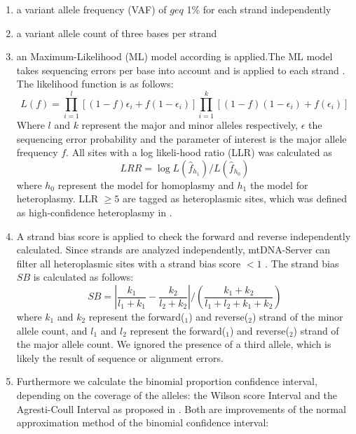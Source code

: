 \begin{enumerate}
\item  a variant allele frequency (VAF) of $geq$ 1\% for each strand independently  
\item  a variant allele count of three bases per strand 
\item  an Maximum-Likelihood (ML) model according \cite{Ye2014} is applied.The ML model takes sequencing errors per base into account and is applied to each strand \cite{Weissensteiner2016b}. The likelihood function is as follows:
\begin{equation}
  L(f)=\prod_{i=1}^{l} [(1-f) \epsilon_{i} + f(1-\epsilon_i)] \prod_{i=1}^{k} [(1-f) (1- \epsilon_{i}) + f(\epsilon_i)] 
\end{equation}
Where $l$ and $k$ represent the major and minor alleles respectively, $\epsilon$ the sequencing error probability and the parameter of interest is the major allele frequency $f$. 
All sites with a log likeli-hood ratio (LLR) was calculated as 
\begin{equation}
  LRR=\log L({\widehat{f}_{h_1}}) /  L({\widehat{f}_{h_0}}) 
\end{equation}
where $h_0$ represent the model for homoplasmy and $h_1$ the model for heteroplasmy. LLR $\geq5$ are tagged as heteroplasmic sites, which was defined as high-confidence heteroplasmy in \cite{Picardi2012}. 
\item  A strand bias score is applied to check the forward and reverse independently calculated. Since strands are analyzed independently, mtDNA-Server can filter all heteroplasmic sites with a strand bias score $<1$ \cite{Weissensteiner2016b,Guo2012}. The strand bias $SB$ is calculated as follows:
\begin{equation}\label{eq:llr}
  SB=\left| \frac{k_1}{l_1+k_1} - \frac{k_2}{l_2+k_2} \right| / \left(\frac{k_1 + k_2}{l_1+l_2+k_1+k_2}\right)
\end{equation}
where $k_1$ and $k_2$ represent the forward($_1$) and reverse($_2$) strand of the minor allele count, and $l_1$ and $l_2$ represent the forward($_1$) and reverse($_2$) strand of the major allele count. We ignored the presence of a third allele, which is likely the result of sequence or alignment errors.
\item Furthermore we calculate the binomial proportion confidence interval, depending on the coverage of the alleles: the Wilson score Interval and the Agresti-Coull Interval as proposed in \cite{Calabrese2014}. 
Both are improvements of the normal approximation method of the binomial confidence interval:

\end{enumerate}
